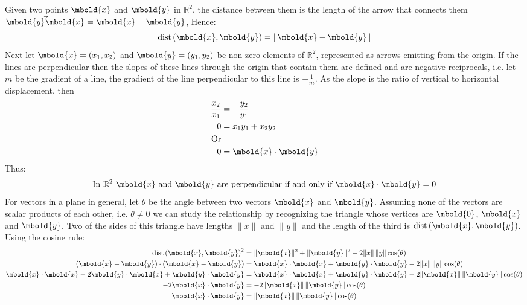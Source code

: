 \documentclass[12pt letter]{report}
\begin{document}
Given two points $\mbold{x}$ and $\mbold{y}$ in $\mathbb{R}^{2}$, the distance between them is the length of the arrow
that connects them $\vec{\mbold{y}\mbold{x}} = \mbold{x} - \mbold{y}$, Hence:
\[
  \text{dist} \left( \mbold{x}, \mbold{y} \right)  = \|\mbold{x} - \mbold{y}\|
\]
Next let $\mbold{x} = \left( x_1, x_2 \right) $ and $\mbold{y} = \left( y_1, y_2 \right) $ be non-zero elements of $\mathbb{R}^2$, represented as arrows emitting from the origin. If the lines are perpendicular then the slopes of these lines through the origin that contain them are defined and are negative reciprocals, i.e.  let $m$ be the gradient of a line, the gradient of the line perpendicular to this line is $-\frac{1}{m}$. As the slope is the ratio of vertical to horizontal displacement, then
\begin{align*}
  \frac{x_2}{x_1} & = -\frac{y_2}{y_1}           \\
  0               & =x_1y_1 + x_2y_2             \\
  \text{Or}                                      \\
  0               & =  \mbold{x} \cdot \mbold{y}
\end{align*}
Thus:
\[
  \text{In $\mathbb{R}^2$ $\mbold{x}$ and $\mbold{y}$ are perpendicular if and only if $\mbold{x} \cdot \mbold{y} = 0$}
\]
For vectors in a plane in general, let $\theta$ be the angle between two vectors $\mbold{x}$ and $\mbold{y}$. Assuming none of the vectors are scalar products of each other, i.e. $\theta \neq 0$ we can study the relationship by recognizing the triangle whose vertices are $\mbold{0}$, $\mbold{x}$ and $\mbold{y}$. Two of the sides of this triangle have lengths $\|x\|$ and $\|y\|$ and the length of the third is $\text{dist} \left( \mbold{x}, \mbold{y} \right) $. Using the cosine rule:
\begin{align*}
  \text{dist} \left( \mbold{x}, \mbold{y} \right)^2                                 & = \|\mbold{x}\|^2 + \|\mbold{y}\|^2 - 2 \|x\| \, \|y\| \cos(\theta)                                      \\
  \left( \mbold{x} - \mbold{y} \right) \cdot  \left( \mbold{x} - \mbold{y} \right)  & = \mbold{x} \cdot \mbold{x} + \mbold{y} \cdot \mbold{y} - 2 \|x\| \, \|y\| \cos(\theta)                  \\
  \mbold{x}\cdot \mbold{x} - 2\mbold{y} \cdot \mbold{x} + \mbold{y} \cdot \mbold{y} & = \mbold{x} \cdot \mbold{x} + \mbold{y} \cdot \mbold{y}  - 2 \|\mbold{x}\| \, \|\mbold{y}\| \cos(\theta) \\
  -2 \mbold{x} \cdot \mbold{y}                                                      & = - 2 \|\mbold{x}\| \, \|\mbold{y}\| \cos(\theta)                                                        \\
  \mbold{x} \cdot \mbold{y}                                                         & = \|\mbold{x}\| \, \|\mbold{y}\| \cos(\theta)                                                            \\
\end{align*}
\end{document}
